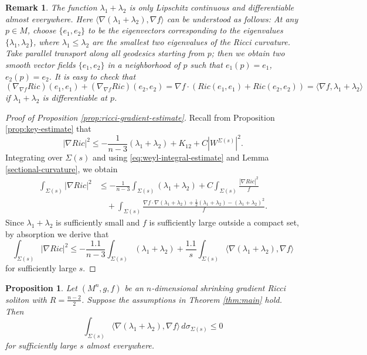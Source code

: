 \documentclass[a4, 12pt]{amsart}
\theoremstyle{plain}
\newtheorem{remark}{Remark}[section]
\newtheorem{prop}[theo]{Proposition}
\begin{document}
\begin{remark}\label{rem:lipshitz}
	The function $\lambda_1+\lambda_2$ is only Lipschitz continuous and differentiable almost everywhere. Here $\langle\nabla (\lambda_1+\lambda_2), \nabla f \rangle$ can be understood as follows: At any $p \in M$, choose $\{e_1, e_2\}$ to be the eigenvectors corresponding to the eigenvalues $\{\lambda_1, \lambda_2\}$, where $\lambda_1 \leq \lambda_2$ are the smallest two eigenvalues of the Ricci curvature. Take parallel transport along all geodesics starting from $p$; then we obtain two smooth vector fields $\{e_1, e_2\}$ in a neighborhood of $p$ such that $e_1(p) = e_1$, $e_2(p) = e_2$. It is easy to check that
	\[
	(\nabla_{\nabla f}Ric)(e_1, e_1) + (\nabla_{\nabla f}Ric)(e_2, e_2) = \nabla f \cdot (Ric(e_1, e_1) + Ric(e_2, e_2)) = \langle\nabla f, \lambda_1+\lambda_2\rangle
	\]
	if $\lambda_1+\lambda_2$ is differentiable at $p$.
\end{remark}

\begin{proof}[Proof of Proposition \ref{prop:ricci-gradient-estimate}]
	Recall from Proposition \ref{prop:key-estimate} that
	\[
	|\nabla Ric|^2 \leq -\frac{1}{n-3}(\lambda_1+\lambda_2) + K_{12} + C|W^{\Sigma(s)}|^2.
	\]
	Integrating over $\Sigma(s)$ and using \eqref{eq:weyl-integral-estimate} and Lemma \ref{sectional-curvature}, we obtain
	\begin{align*}
		\int_{\Sigma(s)}|\nabla Ric|^2 &\leq -\frac{1}{n-3}\int_{\Sigma(s)}(\lambda_1+\lambda_2) + C\int_{\Sigma(s)} \frac{|\nabla Ric|^2}{f} \\
		&\quad + \int_{\Sigma(s)} \frac{\nabla f \cdot \nabla(\lambda_1+\lambda_2) + \frac{1}{2}(\lambda_1+\lambda_2) - (\lambda_1+\lambda_2)^2}{f}.
	\end{align*}
	Since $\lambda_1+\lambda_2$ is sufficiently small and $f$ is sufficiently large outside a compact set, by absorption we derive that
	\[
	\int_{\Sigma(s)}|\nabla Ric|^2 \leq -\frac{1.1}{n-3}\int_{\Sigma(s)}(\lambda_1+\lambda_2) + \frac{1.1}{s}\int_{\Sigma(s)}\langle\nabla (\lambda_1+\lambda_2), \nabla f \rangle
	\]
	for sufficiently large $s$.
\end{proof}

\begin{prop}\label{prop:monotonicity}
	Let $(M^n, g, f)$ be an $n$-dimensional shrinking gradient Ricci soliton with $R = \frac{n-2}{2}$. Suppose the assumptions in Theorem \ref{thm:main} hold. Then
	\begin{equation*}\label{eq:monotonicity}
		\int_{\Sigma(s)} \langle\nabla (\lambda_1+\lambda_2), \nabla f \rangle \, d\sigma_{\Sigma(s)} \leq 0
	\end{equation*}
	for sufficiently large $s$ almost everywhere.
\end{prop}
\end{document}
